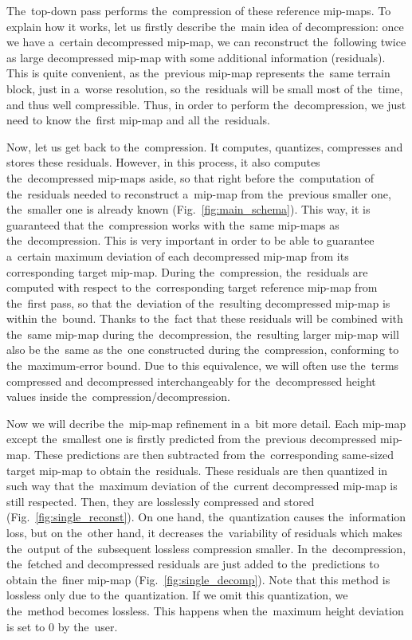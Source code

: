 The~top-down pass performs the~compression of these reference mip-maps. To explain how it works, let us firstly describe the~main idea of decompression: once we have a~certain decompressed mip-map, we can reconstruct the~following twice as large  decompressed mip-map with some additional information (residuals). This is quite convenient, as the~previous mip-map represents the~same terrain block, just in a~worse resolution, so the~residuals will be small most of the~time, and thus well compressible. Thus, in order to perform the~decompression, we just need to know the~first mip-map and all the~residuals. 

Now, let us get back to the~compression. It computes, quantizes, compresses and stores these residuals. However, in this process, it also computes the~decompressed mip-maps aside, so that right before the~computation of the~residuals needed to reconstruct a~mip-map from the~previous smaller one, the~smaller one is already known (Fig.~\ref{fig:main_schema}). This way, it is guaranteed that the~compression works with the~same mip-maps as the~decompression.  This is very important in order to be able to guarantee a~certain maximum deviation of each decompressed mip-map from its corresponding target mip-map. During the~compression, the~residuals are computed with respect to the~corresponding target reference mip-map from the~first pass, so that the~deviation of the~resulting decompressed mip-map is within the~bound. Thanks to the~fact that these residuals will be combined with the~same mip-map during the~decompression, the~resulting larger mip-map will also be the~same as the~one constructed during the~compression, conforming to the~maximum-error bound. Due to this equivalence, we will often use the~terms compressed and decompressed interchangeably for the~decompressed height values inside the~compression/decompression.

Now we will decribe the~mip-map refinement in a~bit more detail. Each mip-map except the~smallest one is firstly predicted from the~previous decompressed mip-map. These predictions are then subtracted from the~corresponding same-sized target mip-map to obtain the~residuals. These residuals are then quantized in such way that the~maximum deviation of the~current decompressed mip-map is still respected. Then, they are losslessly compressed and stored (Fig.~\ref{fig:single_reconst}). On one hand, the~quantization causes the~information loss, but on the~other hand, it decreases the~variability of residuals which makes the~output of the~subsequent lossless compression smaller. In the~decompression, the~fetched and decompressed residuals are just added to the~predictions to obtain the~finer mip-map (Fig.~\ref{fig:single_decomp}). Note that this method is lossless only due to the~quantization. If we omit this quantization, we the~method becomes lossless. This happens when the~maximum height deviation is set to 0 by the~user.

